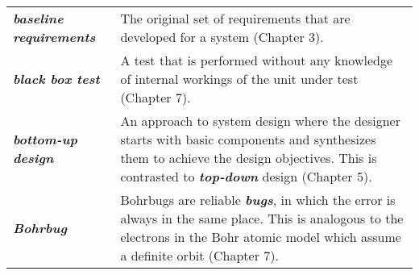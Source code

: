 \begin{longtable} { p{4cm} p{11cm}}
\emph{\textbf{baseline requirements}} & The original set of requirements
that are developed for a system (Chapter 3). \\

\emph{\textbf{black box test}} & A test that is performed without any
knowledge of internal workings of the unit under test (Chapter 7). \\

\emph{\textbf{bottom-up design}} & An approach to system design where
the designer starts with basic components and synthesizes them to
achieve the design objectives. This is contrasted to
\emph{\textbf{top-down}} design (Chapter 5). \\

\emph{\textbf{Bohrbug}} & Bohrbugs are reliable \emph{\textbf{bugs}}, in
which the error is always in the same place. This is analogous to the
electrons in the Bohr atomic model which assume a definite orbit
(Chapter 7). \\


\end{longtable}

